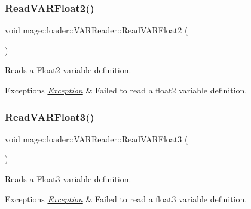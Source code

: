 \subsubsection{\texorpdfstring{Read\+V\+A\+R\+Float2()}{ReadVARFloat2()}}
{\footnotesize\ttfamily void mage\+::loader\+::\+V\+A\+R\+Reader\+::\+Read\+V\+A\+R\+Float2 (\begin{DoxyParamCaption}{ }\end{DoxyParamCaption})\hspace{0.3cm}{\ttfamily [private]}}

Reads a Float2 variable definition.


\begin{DoxyExceptions}{Exceptions}
{\em \hyperlink{classmage_1_1_exception}{Exception}} & Failed to read a float2 variable definition. \\
\hline
\end{DoxyExceptions}
\hypertarget{classmage_1_1loader_1_1_v_a_r_reader_a133ffd4462be737377c0cdb921a90e75}{}\label{classmage_1_1loader_1_1_v_a_r_reader_a133ffd4462be737377c0cdb921a90e75} 
\subsubsection{\texorpdfstring{Read\+V\+A\+R\+Float3()}{ReadVARFloat3()}}
{\footnotesize\ttfamily void mage\+::loader\+::\+V\+A\+R\+Reader\+::\+Read\+V\+A\+R\+Float3 (\begin{DoxyParamCaption}{ }\end{DoxyParamCaption})\hspace{0.3cm}{\ttfamily [private]}}

Reads a Float3 variable definition.


\begin{DoxyExceptions}{Exceptions}
{\em \hyperlink{classmage_1_1_exception}{Exception}} & Failed to read a float3 variable definition. \\
\hline
\end{DoxyExceptions}
\hypertarget{classmage_1_1loader_1_1_v_a_r_reader_a70dfe7e7e0b2fb9a79b6ff4342cc58dc}{}\label{classmage_1_1loader_1_1_v_a_r_reader_a70dfe7e7e0b2fb9a79b6ff4342cc58dc} 
